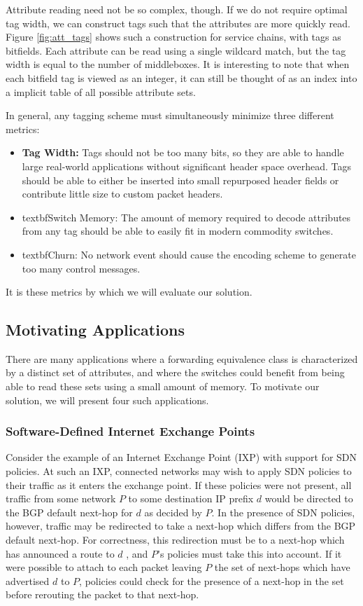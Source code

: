 Attribute reading need not be so complex, though. If we do not require optimal tag width, we can construct tags such that the attributes are more quickly read. Figure \ref{fig:att_tags} shows such a construction for service chains, with tags as bitfields. Each attribute can be read using a single wildcard match, but the tag width is equal to the number of middleboxes. It is interesting to note that when each bitfield tag is viewed as an integer, it can still be thought of as an index into a implicit table of all possible attribute sets. 

In general, any tagging scheme must simultaneously minimize three different metrics:
\begin{itemize}
\item{\textbf{Tag Width:} Tags should not be too many bits, so they are able to handle large real-world applications without significant header space overhead. Tags should be able to either be inserted into small repurposed header fields or contribute little size to custom packet headers. }
\item{textbf{Switch Memory:} The amount of memory required to decode attributes from any tag should be able to easily fit in modern commodity switches.}
\item{textbf{Churn:} No network event should cause the encoding scheme to generate too many control messages.}
\end{itemize}
It is these metrics by which we will evaluate our solution. 


\subsection{Motivating Applications}
There are many applications where a forwarding equivalence class is characterized by a distinct set of attributes, and where the switches could benefit from being able to read these sets using a small amount of memory. To motivate our solution, we will present four such applications. 
 
\subsubsection{Software-Defined Internet Exchange Points}
Consider the example of an Internet Exchange Point (IXP) with support for SDN policies. At such an IXP, connected networks may wish to apply SDN policies to their traffic as it enters the exchange point. If these policies were not present, all traffic from some network $P$  to some destination IP prefix $d$ would be directed to the BGP default next-hop for $d$ as decided by $P$. In the presence of SDN policies, however, traffic may be redirected to take a next-hop which differs from the BGP default next-hop. For correctness, this redirection must be to a next-hop which has announced a route to $d$ , and $P$'s policies must take this into account. If it were possible to attach to each packet leaving $P$ the set of next-hops which have advertised $d$ to $P$, policies could check for the presence of a next-hop in the set before rerouting the packet to that next-hop. 

